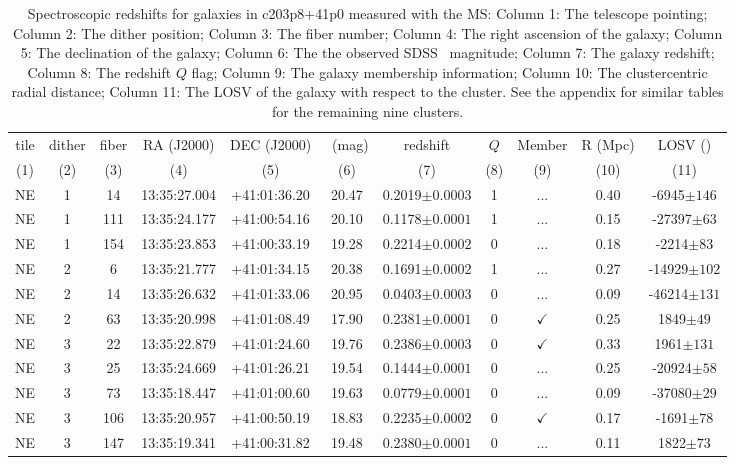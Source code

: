 \begin{table}
	\centering \caption{Spectroscopic redshifts for galaxies in c203p8+41p0 measured with the MS: Column 1: The telescope pointing; Column 2: The dither position; Column 3: The fiber number; Column 4: The right ascension of the galaxy; Column 5: The declination of the galaxy; Column 6: The the observed SDSS \sdssr\ magnitude; Column 7: The galaxy redshift; Column 8: The redshift $Q$ flag; Column 9: The galaxy membership information; Column 10: The clustercentric radial distance; Column 11: The LOSV of the galaxy with respect to the cluster. See the appendix for similar tables for the remaining nine clusters.} 
	\begin{tabular}{ccccccccccc} 
		\hline 
		tile & dither & fiber & RA (J2000) & DEC (J2000) & \sdssr\ (mag) & redshift & $Q$ & Member & R (Mpc) & LOSV (\kms) \\
		(1) & (2) & (3) & (4) & (5) & (6) & (7) & (8) & (9) & (10) & (11) \\
		\hline \hline 
		NE & 1 & 14 & 13:35:27.004 & +41:01:36.20 & 20.47 & 0.2019$\pm{0.0003}$ & 1 & ... & 0.40 & -6945$\pm{146}$ \\
		NE & 1 & 111 & 13:35:24.177 & +41:00:54.16 & 20.10 & 0.1178$\pm{0.0001}$ & 1 & ... & 0.15 & -27397$\pm{63}$ \\
		NE & 1 & 154 & 13:35:23.853 & +41:00:33.19 & 19.28 & 0.2214$\pm{0.0002}$ & 0 & ... & 0.18 & -2214$\pm{83}$ \\
		NE & 2 & 6 & 13:35:21.777 & +41:01:34.15 & 20.38 & 0.1691$\pm{0.0002}$ & 1 & ... & 0.27 & -14929$\pm{102}$ \\
		NE & 2 & 14 & 13:35:26.632 & +41:01:33.06 & 20.95 & 0.0403$\pm{0.0003}$ & 0 & ... & 0.09 & -46214$\pm{131}$ \\
		NE & 2 & 63 & 13:35:20.998 & +41:01:08.49 & 17.90 & 0.2381$\pm{0.0001}$ & 0 & $\checkmark$ & 0.25 & 1849$\pm{49}$ \\
		NE & 3 & 22 & 13:35:22.879 & +41:01:24.60 & 19.76 & 0.2386$\pm{0.0003}$ & 0 & $\checkmark$ & 0.33 & 1961$\pm{131}$ \\
		NE & 3 & 25 & 13:35:24.669 & +41:01:26.21 & 19.54 & 0.1444$\pm{0.0001}$ & 0 & ... & 0.25 & -20924$\pm{58}$ \\
		NE & 3 & 73 & 13:35:18.447 & +41:01:00.60 & 19.63 & 0.0779$\pm{0.0001}$ & 0 & ... & 0.09 & -37080$\pm{29}$ \\
		NE & 3 & 106 & 13:35:20.957 & +41:00:50.19 & 18.83 & 0.2235$\pm{0.0002}$ & 0 & $\checkmark$ & 0.17 & -1691$\pm{78}$ \\
		NE & 3 & 147 & 13:35:19.341 & +41:00:31.82 & 19.48 & 0.2380$\pm{0.0001}$ & 0 & ... & 0.11 & 1822$\pm{73}$ \\

\end{tabular}
\end{table}
